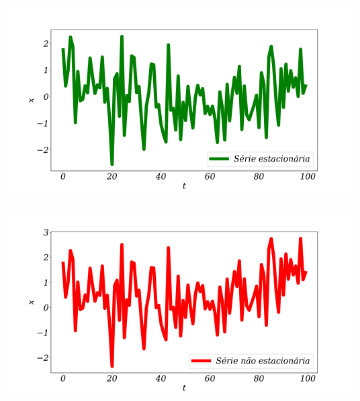 
\begin{figure}[H]
	\centering
	\caption{Exemplo de séries temporais}
	\label{fig:series}
	
	\begin{subfigure}{0.39\textwidth}
		\includegraphics[width=\linewidth]{Revisao/Figuras/serie_estacionaria}
	\end{subfigure}	\hfill
	\begin{subfigure}{0.39\textwidth}
		\includegraphics[width=\linewidth]{Revisao/Figuras/serie_nao_estacionaria_1}
	\end{subfigure}
	

\end{figure}
